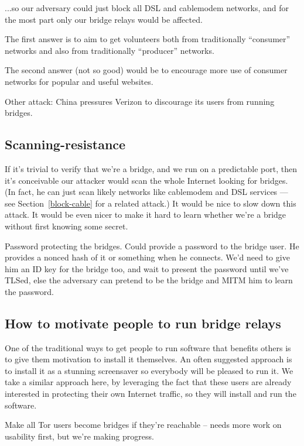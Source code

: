 \documentclass{llncs}
\begin{document}
...so our adversary could just block all DSL and cablemodem networks,
and for the most part only our bridge relays would be affected.

The first answer is to aim to get volunteers both from traditionally
``consumer'' networks and also from traditionally ``producer'' networks.

The second answer (not so good) would be to encourage more use of consumer
networks for popular and useful websites.

Other attack: China pressures Verizon to discourage its users from
running bridges.

\subsection{Scanning-resistance}

If it's trivial to verify that we're a bridge, and we run on a predictable
port, then it's conceivable our attacker would scan the whole Internet
looking for bridges. (In fact, he can just scan likely networks like
cablemodem and DSL services --- see Section~\ref{block-cable} for a related
attack.) It would be nice to slow down this attack. It would
be even nicer to make it hard to learn whether we're a bridge without
first knowing some secret.

Password protecting the bridges.
Could provide a password to the bridge user. He provides a nonced hash of
it or something when he connects. We'd need to give him an ID key for the
bridge too, and wait to present the password until we've TLSed, else the
adversary can pretend to be the bridge and MITM him to learn the password.

\subsection{How to motivate people to run bridge relays}

One of the traditional ways to get people to run software that benefits
others is to give them motivation to install it themselves.  An often
suggested approach is to install it as a stunning screensaver so everybody
will be pleased to run it. We take a similar approach here, by leveraging
the fact that these users are already interested in protecting their
own Internet traffic, so they will install and run the software.

Make all Tor users become bridges if they're reachable -- needs more work
on usability first, but we're making progress.
\end{document}
